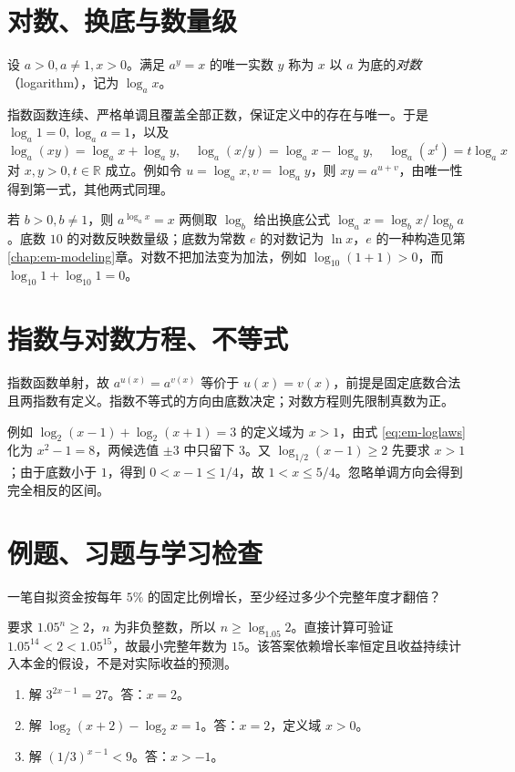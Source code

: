 \section{对数、换底与数量级}
\begin{definition}
设 $a>0,a\ne1,x>0$。满足 $a^y=x$ 的唯一实数 $y$ 称为 $x$ 以 $a$ 为底的\emph{对数}（logarithm），记为 $\log_a x$。
\end{definition}
指数函数连续、严格单调且覆盖全部正数，保证定义中的存在与唯一。于是 $\log_a1=0,\log_a a=1$，以及
\begin{equation}\label{eq:em-loglaws}
 \log_a(xy)=\log_a x+\log_a y,\quad
 \log_a(x/y)=\log_a x-\log_a y,\quad
 \log_a(x^t)=t\log_a x
\end{equation}
对 $x,y>0,t\in\mathbb R$ 成立。例如令 $u=\log_a x,v=\log_a y$，则 $xy=a^{u+v}$，由唯一性得到第一式，其他两式同理。

若 $b>0,b\ne1$，则 $a^{\log_a x}=x$ 两侧取 $\log_b$ 给出换底公式 $\log_a x=\log_b x/\log_b a$。底数 $10$ 的对数反映数量级；底数为常数 $e$ 的对数记为 $\ln x$，$e$ 的一种构造见第\ref{chap:em-modeling}章。对数不把加法变为加法，例如 $\log_{10}(1+1)>0$，而 $\log_{10}1+\log_{10}1=0$。

\section{指数与对数方程、不等式}
指数函数单射，故 $a^{u(x)}=a^{v(x)}$ 等价于 $u(x)=v(x)$，前提是固定底数合法且两指数有定义。指数不等式的方向由底数决定；对数方程则先限制真数为正。

例如 $\log_2(x-1)+\log_2(x+1)=3$ 的定义域为 $x>1$，由式 \eqref{eq:em-loglaws} 化为 $x^2-1=8$，两候选值 $\pm3$ 中只留下 $3$。又 $\log_{1/2}(x-1)\ge2$ 先要求 $x>1$；由于底数小于 $1$，得到 $0<x-1\le1/4$，故 $1<x\le5/4$。忽略单调方向会得到完全相反的区间。

\section{例题、习题与学习检查}
\begin{example}
一笔自拟资金按每年 $5\%$ 的固定比例增长，至少经过多少个完整年度才翻倍？
\end{example}
\begin{solve}
要求 $1.05^n\ge2$，$n$ 为非负整数，所以 $n\ge\log_{1.05}2$。直接计算可验证 $1.05^{14}<2<1.05^{15}$，故最小完整年数为 $15$。该答案依赖增长率恒定且收益持续计入本金的假设，不是对实际收益的预测。
\end{solve}
\begin{enumerate}
\item 解 $3^{2x-1}=27$。答：$x=2$。
\item 解 $\log_2(x+2)-\log_2x=1$。答：$x=2$，定义域 $x>0$。
\item 解 $(1/3)^{x-1}<9$。答：$x>-1$。
\end{enumerate}

